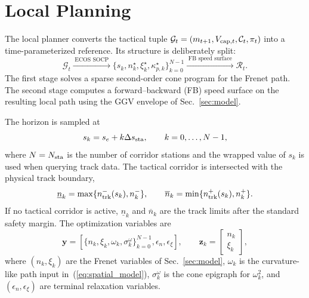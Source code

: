 \documentclass{iopjournal}
\begin{document}
\section{Local Planning}\label{sec:planner}
The local planner converts the tactical tuple
$\mathcal{G}_t=(m_{t+1},V_{{\rm cap},t},\mathcal{C}_t,\pi_t)$ into a
time-parameterized reference.  Its structure is deliberately split:
\begin{equation}
\mathcal{G}_t
\xrightarrow{\;\text{ECOS SOCP}\;}
\{s_k,n_k^\star,\xi_k^\star,\kappa_{p,k}^\star\}_{k=0}^{N-1}
\xrightarrow{\;\text{FB speed surface}\;}
\mathcal{R}_t .
\label{eq:planner_pipeline}
\end{equation}
The first stage solves a sparse second-order cone program for the Frenet path.
The second stage computes a forward--backward (FB) speed surface on the
resulting local path using the GGV envelope of Sec.~\ref{sec:model}.

The horizon is sampled at
\begin{equation}
s_k=s_e+k\Delta s_{\rm sta},\qquad k=0,\ldots,N-1,
\label{eq:planner_grid}
\end{equation}
where $N=N_{\rm sta}$ is the number of corridor stations and the wrapped value of $s_k$ is used when querying track data.  The
tactical corridor is intersected with the physical track boundary,
\begin{equation}
\underline n_k=\max\{n_{\rm trk}^-(s_k),n_k^-\},\qquad
\overline n_k=\min\{n_{\rm trk}^+(s_k),n_k^+\}.
\label{eq:planner_corridor_intersection}
\end{equation}
If no tactical corridor is active, $\underline n_k$ and $\overline n_k$ are
the track limits after the standard safety margin.  The optimization variables
are
\begin{equation}
\bm y=
\left[
\{n_k,\xi_k,\omega_k,\sigma_k^\omega\}_{k=0}^{N-1},
\epsilon_n,\epsilon_\xi
\right],
\qquad
\bm z_k=\begin{bmatrix}n_k\\ \xi_k\end{bmatrix},
\label{eq:path_decision}
\end{equation}
where $(n_k,\xi_k)$ are the Frenet variables of Sec.~\ref{sec:model},
$\omega_k$ is the curvature-like path input in~(\ref{eq:spatial_model}),
$\sigma_k^\omega$ is the cone epigraph for $\omega_k^2$, and
$(\epsilon_n,\epsilon_\xi)$ are terminal relaxation variables.
\end{document}
